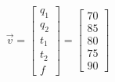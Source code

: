 

$$\overrightarrow{v} = 
	\begin{bmatrix}
		q_{1} \\
		q_{2} \\
		t_{1} \\
		t_{2} \\
		f 
	\end{bmatrix} = 
	\begin{bmatrix}
		70 \\
		85 \\
		80 \\
		75 \\
		90 
	\end{bmatrix}$$

